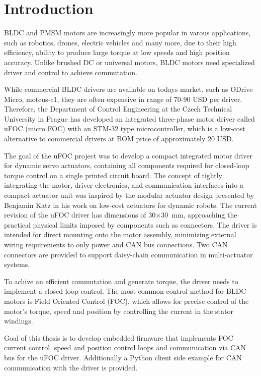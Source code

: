 \chapter{Introduction}
BLDC and PMSM motors are increasingly more popular in varous applications, such as robotics, drones, electric vehicles and many more, due to their high efficiency, 
ability to produce large torque at low speeds and high position accuracy. Unlike brushed DC or universal motors, 
BLDC motors need specialized driver and control to achieve commutation.

While commercial BLDC drivers are available on todays market, such as ODrive Micro, moteus-c1, 
they are often expensive in range of 70-90 USD per driver. \cite{moteus_c1} \cite{odrive_micro}
Therefore, the Department of Control Engineering at the Czech Technical University in Prague has developed an 
integrated three-phase motor driver called uFOC (micro FOC) with an STM-32 type microcontroller, 
which is a low-cost alternative to commercial drivers at BOM price of approximately 20 USD. \cite{uFOC}

The goal of the uFOC project was to develop a compact integrated motor driver for dynamic servo actuators, 
containing all components required for closed-loop torque control on a single printed circuit board.
The concept of tightly integrating the motor, driver electronics, 
and communication interfaces into a compact actuator unit was inspired by the modular actuator design presented
by Benjamin Katz in his work on low-cost actuators for dynamic robots. \cite{ben_katz}
The current revision of the uFOC driver has dimensions of 30×30~mm, approaching the practical physical limits imposed by components such as connectors.
The driver is intended for direct mounting onto the motor assembly, minimizing external wiring requirements to only power and CAN bus connections.
Two CAN connectors are provided to support daisy-chain communication in multi-actuator systems. \cite{uFOC}

To achive an efficient commutation and generate torque, the driver needs to implement a closed loop control.
The most common control method for BLDC motors is Field Oriented Control (FOC), 
which allows for precise control of the motor's torque, speed and position by controlling the current in the stator windings.

Goal of this thesis is to develop embedded firmware that implements FOC current control, speed and position control loops and communication via CAN bus for the uFOC driver. 
Additionally a Python client side example for CAN communication with the driver is provided.



